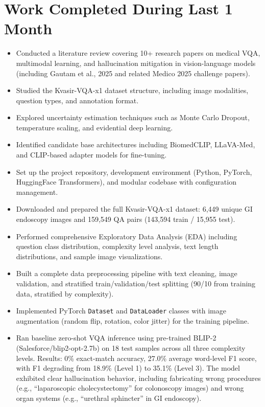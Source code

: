 \documentclass[12pt,a4paper]{article}
\begin{document}
\section{Work Completed During Last 1 Month}
\begin{itemize}[leftmargin=*]
    \item Conducted a literature review covering 10+ research papers on medical VQA, multimodal learning, and hallucination mitigation in vision-language models (including Gautam et al., 2025 and related Medico 2025 challenge papers).
    \item Studied the Kvasir-VQA-x1 dataset structure, including image modalities, question types, and annotation format.
    \item Explored uncertainty estimation techniques such as Monte Carlo Dropout, temperature scaling, and evidential deep learning.
    \item Identified candidate base architectures including BiomedCLIP, LLaVA-Med, and CLIP-based adapter models for fine-tuning.
    \item Set up the project repository, development environment (Python, PyTorch, HuggingFace Transformers), and modular codebase with configuration management.
    \item Downloaded and prepared the full Kvasir-VQA-x1 dataset: 6,449 unique GI endoscopy images and 159,549 QA pairs (143,594 train / 15,955 test).
    \item Performed comprehensive Exploratory Data Analysis (EDA) including question class distribution, complexity level analysis, text length distributions, and sample image visualizations.
    \item Built a complete data preprocessing pipeline with text cleaning, image validation, and stratified train/validation/test splitting (90/10 from training data, stratified by complexity).
    \item Implemented PyTorch \texttt{Dataset} and \texttt{DataLoader} classes with image augmentation (random flip, rotation, color jitter) for the training pipeline.
    \item Ran baseline zero-shot VQA inference using pre-trained BLIP-2 (Salesforce/blip2-opt-2.7b) on 18 test samples across all three complexity levels. Results: 0\% exact-match accuracy, 27.0\% average word-level F1 score, with F1 degrading from 18.9\% (Level 1) to 35.1\% (Level 3). The model exhibited clear hallucination behavior, including fabricating wrong procedures (e.g., ``laparoscopic cholecystectomy'' for colonoscopy images) and wrong organ systems (e.g., ``urethral sphincter'' in GI endoscopy).
\end{itemize}
\end{document}
